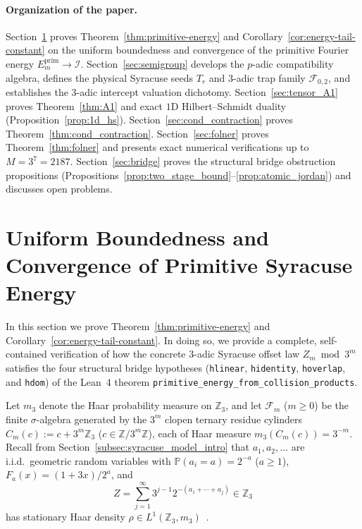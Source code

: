 \documentclass[11pt,a4paper]{article}
\numberwithin{equation}{section}
\theoremstyle{definition}
\theoremstyle{remark}
\newcommand{\Z}{\mathbb{Z}}
\renewcommand{\P}{\mathbb{P}}
\newcommand{\cF}{\mathcal{F}}
\newcommand{\cI}{\mathcal{I}}
\newcommand{\prim}{\mathrm{prim}}
\begin{document}
\paragraph{Organization of the paper.}
Section~\ref{sec:primitive-energy} proves Theorem~\ref{thm:primitive-energy} and Corollary~\ref{cor:energy-tail-constant} on the uniform boundedness and convergence of the primitive Fourier energy $E_m^{\prim} \to \cI$. Section~\ref{sec:semigroup} develops the $p$-adic compatibility algebra, defines the physical Syracuse seeds $T_r$ and $3$-adic trap family $\cF_{0,2}$, and establishes the $3$-adic intercept valuation dichotomy. Section~\ref{sec:tensor_A1} proves Theorem~\ref{thm:A1} and exact $1$D Hilbert--Schmidt duality (Proposition~\ref{prop:1d_hs}). Section~\ref{sec:cond_contraction} proves Theorem~\ref{thm:cond_contraction}. Section~\ref{sec:folner} proves Theorem~\ref{thm:folner} and presents exact numerical verifications up to $M = 3^7 = 2187$. Section~\ref{sec:bridge} proves the structural bridge obstruction propositions (Propositions~\ref{prop:two_stage_bound}--\ref{prop:atomic_jordan}) and discusses open problems.

\section{Uniform Boundedness and Convergence of Primitive Syracuse Energy}\label{sec:primitive-energy}

In this section we prove Theorem~\ref{thm:primitive-energy} and Corollary~\ref{cor:energy-tail-constant}. In doing so, we provide a complete, self-contained verification of how the concrete $3$-adic Syracuse offset law $Z_m \bmod 3^m$ satisfies the four structural bridge hypotheses (\texttt{hlinear}, \texttt{hidentity}, \texttt{hoverlap}, and \texttt{hdom}) of the Lean~4 theorem \texttt{primitive\_energy\_from\_collision\_products}.

Let $m_3$ denote the Haar probability measure on $\Z_3$, and let $\cF_m$ ($m \ge 0$) be the finite $\sigma$-algebra generated by the $3^m$ clopen ternary residue cylinders $C_m(c) := c + 3^m\Z_3$ ($c \in \Z/3^m\Z$), each of Haar measure $m_3(C_m(c)) = 3^{-m}$. Recall from Section~\ref{subsec:syracuse_model_intro} that $a_1, a_2, \dots$ are i.i.d.\ geometric random variables with $\P(a_i = a) = 2^{-a}$ ($a \ge 1$), $F_a(x) = (1 + 3x)/2^a$, and
\[
 Z = \sum_{j=1}^\infty 3^{j-1} 2^{-(a_1 + \cdots + a_j)} \in \Z_3
\]
has stationary Haar density $\rho \in L^1(\Z_3, m_3)$~\cite[Proposition~1.14]{Tao2019}.
\end{document}

